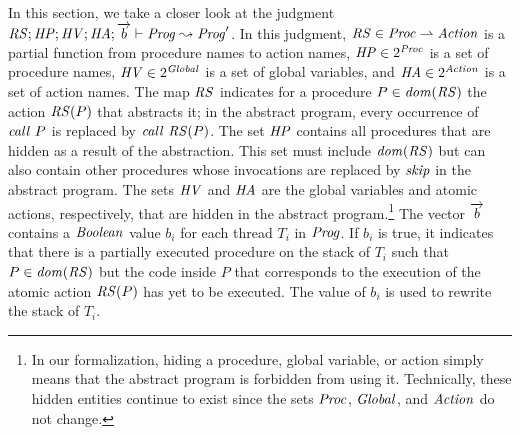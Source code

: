 
In this section, we take a closer look at the judgment
$\mathit{RS};\mathit{HP};\mathit{HV};\mathit{HA};\overrightarrow{b} \vdash \mathit{Prog} \leadsto \mathit{Prog}'$.
In this judgment, 
$\mathit{RS} \in \mathit{Proc} \rightharpoonup \mathit{Action}$ is a partial function from procedure names to action names,
$\mathit{HP} \in 2^{\mathit{Proc}}$ is a set of procedure names,
$\mathit{HV} \in 2^{\mathit{Global}}$ is a set of global variables,
and $\mathit{HA} \in 2^{\mathit{Action}}$ is a set of action names.
The map $\mathit{RS}$ indicates for a procedure $P \in \mathit{dom}(\mathit{RS})$ the action $\mathit{RS}(P)$ 
that abstracts it;
in the abstract program, every occurrence of $\mathit{call}\ P$ is replaced by $\mathit{call}\ \mathit{RS}(P)$.
The set $\mathit{HP}$ contains all procedures that are hidden as a result of the abstraction.
This set must include $\mathit{dom}(\mathit{RS})$ but can also contain other procedures whose invocations 
are replaced by $\mathit{skip}$ in the abstract program.
The sets $\mathit{HV}$ and $\mathit{HA}$ are the global variables and atomic actions, 
respectively, that are hidden in the abstract program.\footnote{In our formalization, 
hiding a procedure, global variable, or action simply means that the abstract program is forbidden from using it.
Technically, these hidden entities continue to exist since the sets $\mathit{Proc}$, $\mathit{Global}$, and $\mathit{Action}$ do not change.}
The vector $\overrightarrow{b}$ contains a $\mathit{Boolean}$ value $b_i$ for each thread $T_i$ in $\mathit{Prog}$.
If $b_i$ is true, it indicates that there is a partially executed procedure on the stack of $T_i$ 
such that $P \in \mathit{dom}(\mathit{RS})$ but the code inside $P$ that corresponds to the execution of the atomic action $\mathit{RS}(P)$
has yet to be executed.
The value of $b_i$ is used to rewrite the stack of $T_i$.

